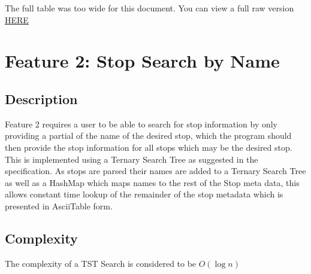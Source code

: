 \documentclass[12pt]{report}
\begin{document}
	The full table was too wide for this document. You can view a full raw version \href{https://gist.githubusercontent.com/ParadauxIO/5a698a097d60d48a94c2e4898b4f44c5/raw/3f5f5dc035c45389228e862976ad3f1fdaff4fdc/gistfile1.txt}{HERE}
	\section{Feature 2: Stop Search by Name} \label{ft2}
	\subsection{Description}
	Feature 2 requires a user to be able to search for stop information by only providing a partial of the name of the desired stop, which the program should then provide the stop information for all stops which may be the desired stop. This is implemented using a Ternary Search Tree as suggested in the specification. As stops are parsed their names are added to a Ternary Search Tree as well as a HashMap which maps names to the rest of the Stop meta data, this allows constant time lookup of the remainder of the stop metadata which is presented in AsciiTable form.  
	
	
	\subsection{Complexity}
	The complexity of a TST Search is considered to be $O(\log n)$
\end{document}
